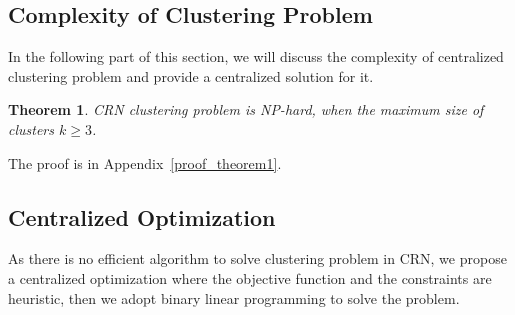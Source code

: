\documentclass[10pt,journal,compsoc]{IEEEtran}
\theoremstyle{mytheoremstyle}
\newtheorem{theorem}{Theorem}[section]
\theoremstyle{mytheoremstyle}
\theoremstyle{mytheoremstyle}
\newcommand{\ie}{i.e., }
\newcommand{\bigO}{\ensuremath{\mathcal{O}}}%
\begin{document}
\subsection{Complexity of Clustering Problem}
In the following part of this section, we will discuss the complexity of centralized clustering problem and provide a centralized solution for it.

\begin{theorem}
\label{theorem1}
CRN clustering problem is NP-hard, when the maximum size of clusters $k\geqslant 3$.
\end{theorem}
The proof is in Appendix~\ref{proof_theorem1}.



\subsection{Centralized Optimization}

As there is no efficient algorithm to solve clustering problem in CRN, we propose a centralized optimization where the objective function and the constraints are heuristic, then we adopt binary linear programming to solve the problem.



\end{document}
